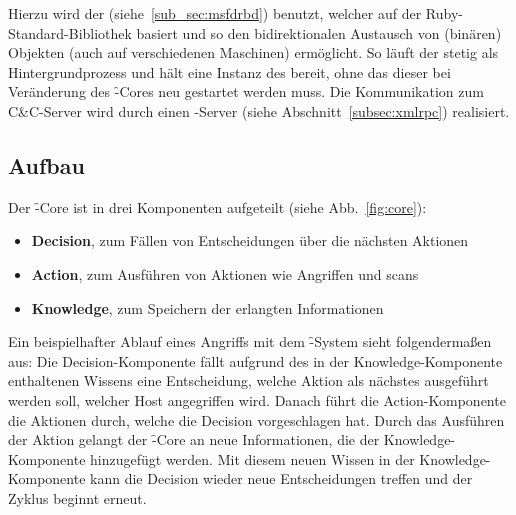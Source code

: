 Hierzu wird der  (siehe~\ref{sub_sec:msfdrbd}) benutzt,
welcher auf der Ruby-Standard-Bibliothek  basiert und so den
bidirektionalen Austausch von (binären) Objekten (auch auf
verschiedenen Maschinen) ermöglicht.  So läuft der 
stetig als Hintergrundprozess und hält eine Instanz des 
bereit, ohne das dieser bei Veränderung des \f-Cores neu gestartet
werden muss. Die Kommunikation zum C\&C-Server wird durch einen
-Server (siehe Abschnitt~\ref{subsec:xmlrpc}) realisiert.

\subsection{Aufbau}
\label{sec:core:architecture}

Der \f-Core ist in drei Komponenten aufgeteilt (siehe Abb.~\ref{fig:core}):

\begin{itemize}
  \item \textbf{Decision}, zum Fällen von Entscheidungen über die nächsten Aktionen
  \item \textbf{Action}, zum Ausführen von Aktionen wie Angriffen und scans
  \item \textbf{Knowledge}, zum Speichern der erlangten Informationen
\end{itemize}

Ein beispielhafter Ablauf eines Angriffs mit dem \f-System sieht
folgendermaßen aus:  Die Decision-Komponente fällt aufgrund des in der
Knowledge-Komponente enthaltenen Wissens eine Entscheidung, welche
Aktion als nächstes ausgeführt werden soll, \zB welcher Host
angegriffen wird.  Danach führt die Action-Komponente die Aktionen
durch, welche die Decision vorgeschlagen hat.  Durch das Ausführen der
Aktion gelangt der \f-Core an neue Informationen, die der
Knowledge-Komponente hinzugefügt werden.  Mit diesem neuen Wissen in
der Knowledge-Komponente kann die Decision wieder neue Entscheidungen
treffen und der Zyklus beginnt erneut.

